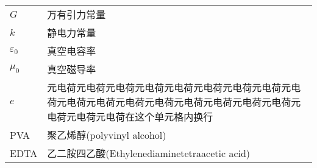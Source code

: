\begin{denotation}
\begin{longtable}[c]{p{2.5cm}p{12cm}}
    $G$                 & 万有引力常量      \\
    $k$                 & 静电力常量        \\
    $\varepsilon _0$    & 真空电容率        \\
    $\mu_0$             & 真空磁导率        \\
    $e$                 & 元电荷元电荷元电荷元电荷元电荷元电荷元电荷元电荷元电荷元电荷元电荷元电荷元电荷元电荷元电荷元电荷元电荷元电荷元电荷元电荷在这个单元格内换行            \\
    PVA                 & 聚乙烯醇(polyvinyl alcohol)\\
    EDTA                & 乙二胺四乙酸(Ethylenediaminetetraacetic acid)\\* \bottomrule
    \end{longtable}
\end{denotation}